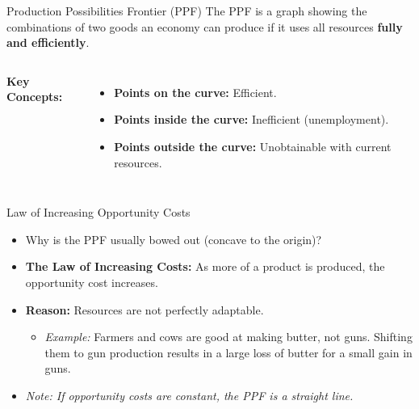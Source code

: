 \documentclass{beamer}
\begin{document}
\begin{frame}{Production Possibilities Frontier (PPF)}
    The PPF is a graph showing the combinations of two goods an economy can produce if it uses all resources \textbf{fully and efficiently}.
    
    \begin{columns}
        \textbf{Key Concepts:}
        \begin{itemize}
            \item \textbf{Points on the curve:} Efficient.
            \item \textbf{Points inside the curve:} Inefficient (unemployment).
            \item \textbf{Points outside the curve:} Unobtainable with current resources.
        \end{itemize}
        
        \begin{center}
        \end{center}
    \end{columns}
\end{frame}

\begin{frame}{Law of Increasing Opportunity Costs}
    \begin{itemize}
        \item Why is the PPF usually bowed out (concave to the origin)?
        \item \textbf{The Law of Increasing Costs:} As more of a product is produced, the opportunity cost increases.
        \item \textbf{Reason:} Resources are not perfectly adaptable.
        \begin{itemize}
            \item \textit{Example:} Farmers and cows are good at making butter, not guns. Shifting them to gun production results in a large loss of butter for a small gain in guns.
        \end{itemize}
        \item \textit{Note: If opportunity costs are constant, the PPF is a straight line.}
    \end{itemize}
\end{frame}
\end{document}
